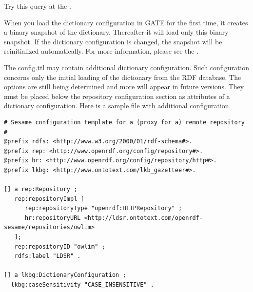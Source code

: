 Try this query at the .

When you load the dictionary configuration in GATE for the first time, it
creates a binary snapshot of the dictionary. Thereafter it will load only this
binary snapshot. If the dictionary configuration is changed, the snapshot will
be reinitialized automatically. For more information, please see the
.


The config.ttl may contain additional dictionary configuration. Such
configuration concerns only the initial loading of the dictionary from the RDF
database. The options are still being determined and more will appear in
future versions. They must be placed below the repository configuration
section as attributes of a dictionary configuration. Here is a sample
 file with additional configuration.

\begin{pverbatimbox}
\begin{small}\begin{verbatim}
# Sesame configuration template for a (proxy for a) remote repository
#
@prefix rdfs: <http://www.w3.org/2000/01/rdf-schema#>.
@prefix rep: <http://www.openrdf.org/config/repository#>.
@prefix hr: <http://www.openrdf.org/config/repository/http#>.
@prefix lkbg: <http://www.ontotext.com/lkb_gazetteer#>.

[] a rep:Repository ;
   rep:repositoryImpl [
      rep:repositoryType "openrdf:HTTPRepository" ;
      hr:repositoryURL <http://ldsr.ontotext.com/openrdf-sesame/repositories/owlim>
   ];
   rep:repositoryID "owlim" ;
   rdfs:label "LDSR" .
   
[] a lkbg:DictionaryConfiguration ; 
  lkbg:caseSensitivity "CASE_INSENSITIVE" .  
\end{verbatim}\end{small}
\end{pverbatimbox}


